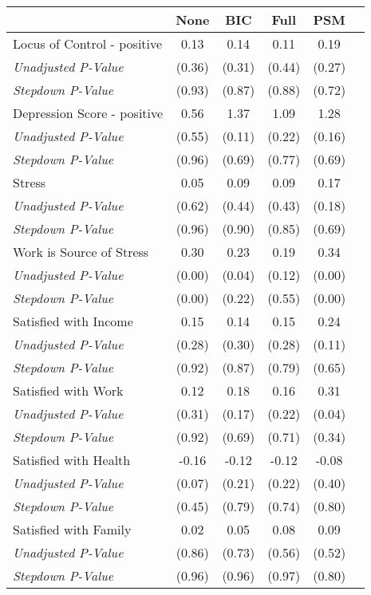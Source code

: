 \begin{tabular}{l c c c c c}
\toprule
 & None & BIC & Full & PSM \\
\midrule
Locus of Control - positive & 0.13 & 0.14 & 0.11 & 0.19 \\
\quad \textit{Unadjusted P-Value} & (0.36) & (0.31) & (0.44) & (0.27) \\
\quad \textit{Stepdown P-Value} & (0.93) & (0.87) & (0.88) & (0.72) \\
Depression Score - positive & 0.56 & 1.37 & 1.09 & 1.28 \\
\quad \textit{Unadjusted P-Value} & (0.55) & (0.11) & (0.22) & (0.16) \\
\quad \textit{Stepdown P-Value} & (0.96) & (0.69) & (0.77) & (0.69) \\
Stress & 0.05 & 0.09 & 0.09 & 0.17 \\
\quad \textit{Unadjusted P-Value} & (0.62) & (0.44) & (0.43) & (0.18) \\
\quad \textit{Stepdown P-Value} & (0.96) & (0.90) & (0.85) & (0.69) \\
Work is Source of Stress & 0.30 & 0.23 & 0.19 & 0.34 \\
\quad \textit{Unadjusted P-Value} & (0.00) & (0.04) & (0.12) & (0.00) \\
\quad \textit{Stepdown P-Value} & (0.00) & (0.22) & (0.55) & (0.00) \\
Satisfied with Income & 0.15 & 0.14 & 0.15 & 0.24 \\
\quad \textit{Unadjusted P-Value} & (0.28) & (0.30) & (0.28) & (0.11) \\
\quad \textit{Stepdown P-Value} & (0.92) & (0.87) & (0.79) & (0.65) \\
Satisfied with Work & 0.12 & 0.18 & 0.16 & 0.31 \\
\quad \textit{Unadjusted P-Value} & (0.31) & (0.17) & (0.22) & (0.04) \\
\quad \textit{Stepdown P-Value} & (0.92) & (0.69) & (0.71) & (0.34) \\
Satisfied with Health & -0.16 & -0.12 & -0.12 & -0.08 \\
\quad \textit{Unadjusted P-Value} & (0.07) & (0.21) & (0.22) & (0.40) \\
\quad \textit{Stepdown P-Value} & (0.45) & (0.79) & (0.74) & (0.80) \\
Satisfied with Family & 0.02 & 0.05 & 0.08 & 0.09 \\
\quad \textit{Unadjusted P-Value} & (0.86) & (0.73) & (0.56) & (0.52) \\
\quad \textit{Stepdown P-Value} & (0.96) & (0.96) & (0.97) & (0.80) \\

\end{tabular}
